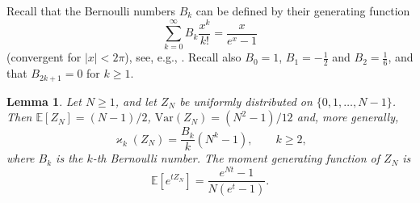 \documentclass[11pt]{article}
\newcommand{\E}[1]{\mathbb{E} \left[#1\right]}
\newcommand{\Va}[1]{{\mathrm{Var}}\left(#1\right)}
\numberwithin{theorem}{section}
\newtheorem{lemma}[theorem]{Lemma}
\theoremstyle{definition}
\numberwithin{equation}{section}
\newcommand\kk{\varkappa}
\begin{document}
Recall that the Bernoulli numbers $B_k$ can be defined by their generating
function
\begin{equation}\label{Bernoulli}
  \sum_{k=0}^\infty B_k\frac{x^k}{k!} = \frac{x}{e^x-1}
\end{equation}
(convergent for $|x|<2\pi$), see, e.g., \cite[(24.2.1)]{NIST:DLMF}.
Recall also $B_0=1$, $B_1=-\frac12$ and $B_2=\frac{1}6$, and that
$B_{2k+1}=0$ for $k\ge1$.

\begin{lemma}\label{lem:Z}
Let $N\ge1$, and  let $Z_N$ be uniformly distributed on
$\{0,1,\dots,N-1\}$. Then 
$\E {Z_N}= (N-1)/2$,
$\Va {Z_N}=(N^2-1)/12$
and, more generally,
\begin{equation}\label{kk}
\kk_k(Z_N)=\frac{B_k}{k}(N^k-1),
\qquad k\ge2,
\end{equation}
where $B_k$ is the $k$-th Bernoulli number.
The moment generating function of \(Z_N\) is
\begin{equation}\label{mgfZ}
  \E{e^{tZ_N}} %
= \frac{e^{Nt}-1}{N(e^t-1)}.
\end{equation}
\end{lemma}
\end{document}
